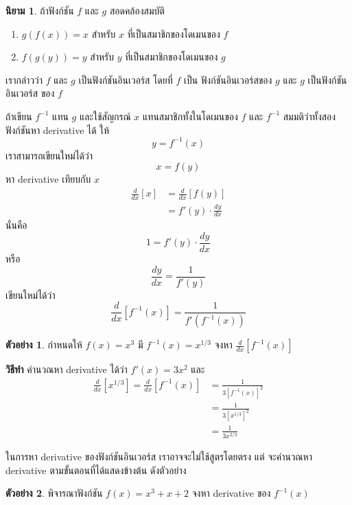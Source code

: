 \documentclass[
]{book}
\theoremstyle{definition}
\newtheorem{definition}{นิยาม}[chapter]
\theoremstyle{definition}
\newtheorem{example}{ตัวอย่าง}[chapter]
\theoremstyle{definition}
\theoremstyle{definition}
\theoremstyle{remark}
\begin{document}
\begin{definition}
ถ้าฟังก์ชัน \(f\) และ \(g\) สอดคล้องสมบัติ

\begin{enumerate}
\def\labelenumi{\arabic{enumi}.}
\item
  \(g(f(x)) = x\) สำหรับ \(x\) ที่เป็นสมาชิกของโดเมนของ \(f\)
\item
  \(f(g(y)) = y\) สำหรับ \(y\) ที่เป็นสมาชิกของโดเมนของ \(g\)
\end{enumerate}

เรากล่าวว่า \(f\) และ \(g\) เป็นฟังก์ชันอินเวอร์ส โดยที่ \(f\) เป็น ฟังก์ชันอินเวอร์สของ \(g\)
และ \(g\) เป็นฟังก์ชันอินเวอร์ส ของ \(f\)
\end{definition}

ถ้าเขียน \(f^{-1}\) แทน \(g\) และใช้สัญกรณ์ \(x\) แทนสมาชิกทั้งในโดเมนของ \(f\) และ
\(f^{-1}\) สมมติว่าทั้งสองฟังก์ชันหา derivative ได้ ให้ \[y = f^{-1}(x)\]
เราสามารถเขียนใหม่ได้ว่า \[x = f(y)\] หา derivative เทียบกับ \(x\)
\begin{equation}   \begin{aligned}
    \frac{d}{dx}[x]
    &= \frac{d}{dx}[f(y)] \\
    &= f'(y) \cdot \frac{dy}{dx}
  \end{aligned} \end{equation} นั่นคือ \[1 = f'(y) \cdot \frac{dy}{dx}\] หรือ
\[\frac{dy}{dx} = \frac{1}{f'(y)}\] เขียนใหม่ได้ว่า \[\label{E:inverse}
\boxed{
    \frac{d}{dx}[f^{-1}(x)] = \frac{1}{f'(f^{-1}(x))}
}\]

\begin{example}
กำหนดให้ \(f(x) = x^3\) มี \(f^{-1}(x) = x^{1/3}\) จงหา
\(\frac{d}{dx} [f^{-1}(x)]\)
\end{example}

\textbf{วิธีทำ} คำนวณหา derivative ได้ว่า \(f'(x) = 3x^2\) และ \begin{equation}   \begin{aligned}
    \frac{d}{dx} [x^{1/3}]  = \frac{d}{dx} [f^{-1}(x)]
    &= \frac{1}{3[f^{-1}(x)]^2} \\
    &= \frac{1}{3[x^{1/3}]^2} \\
    &= \frac{1}{3x^{2/3}}
  \end{aligned} \end{equation}

ในการหา derivative ของฟังก์ชันอินเวอร์ส เราอาจจะไม่ใช้สูตรโดยตรง แต่ จะคำนวณหา
derivative ตามขั้นตอนที่ได้แสดงข้างต้น ดังตัวอย่าง

\begin{example}
พิจารณาฟังก์ชัน \(f(x) = x^3+x+2\) จงหา derivative ของ \(f^{-1}(x)\)
\end{example}
\end{document}
